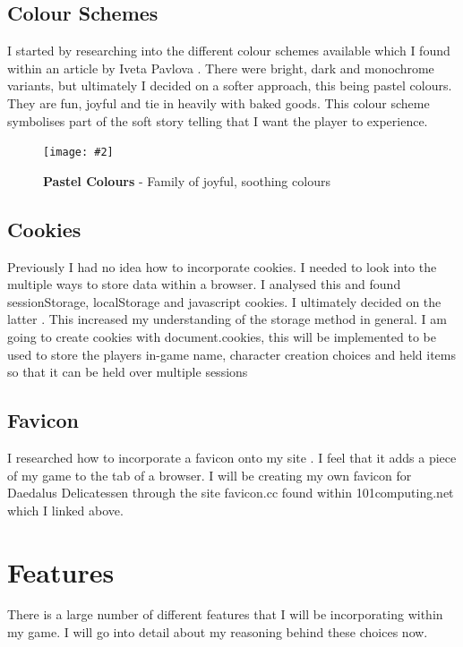 \documentclass[10pt, a4paper]{article}
\newcommand{\figuremacro}[5]{
    \begin{figure}[#1]
        \centering
        \texttt{[image: \#2]}
        \caption[#3]{\textbf{#3}#4}
        \label{fig:#2}
    \end{figure}
}
\begin{document}
	\subsection{Colour Schemes}
	I started by researching into the different colour schemes available which I found within an article by Iveta Pavlova \cite{ColourSchemes}. There were bright, dark and monochrome variants, but ultimately I decided on a softer approach, this being pastel colours. They are fun, joyful and tie in heavily with baked goods. This colour scheme symbolises part of the soft story telling that I want the player to experience. \\
	\figuremacro{h}{pastel}{Pastel Colours}{ - Family of joyful, soothing colours \cite{PastelColours}}{1.0}
  
	\subsection{Cookies}
	Previously I had no idea how to incorporate cookies. I needed to look into the multiple ways to store data within a browser. I analysed this and found sessionStorage, localStorage and javascript cookies. I ultimately decided on the latter \cite{JavascriptCookies}. This increased my understanding of the storage method in general. I am going to create cookies with document.cookies, this will be implemented to be used to store the players in-game name, character creation choices and held items so that it can be held over multiple sessions 
	
	\subsection{Favicon}
	I researched how to incorporate a favicon onto my site \cite{Favicon}. I feel that it adds a piece of my game to the tab of a browser. I will be creating my own favicon for Daedalus Delicatessen through the site favicon.cc found within 101computing.net which I linked above.

    \section{Features}
    There is a large number of different features that I will be incorporating within my game. I will go into detail about my reasoning behind these choices now. 
    
\end{document}
